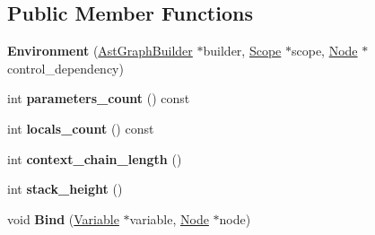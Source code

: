 \subsection*{Public Member Functions}
\begin{DoxyCompactItemize}
\item 
{\bfseries Environment} (\hyperlink{classv8_1_1internal_1_1compiler_1_1_ast_graph_builder}{Ast\+Graph\+Builder} $\ast$builder, \hyperlink{classv8_1_1internal_1_1_scope}{Scope} $\ast$scope, \hyperlink{classv8_1_1internal_1_1compiler_1_1_node}{Node} $\ast$control\+\_\+dependency)\hypertarget{classv8_1_1internal_1_1compiler_1_1_ast_graph_builder_1_1_environment_a28b10408f4df6a0f319e955a267ce7bc}{}\label{classv8_1_1internal_1_1compiler_1_1_ast_graph_builder_1_1_environment_a28b10408f4df6a0f319e955a267ce7bc}

\item 
int {\bfseries parameters\+\_\+count} () const \hypertarget{classv8_1_1internal_1_1compiler_1_1_ast_graph_builder_1_1_environment_af3737b4f3c9da4ed54ea6dd832f78bf1}{}\label{classv8_1_1internal_1_1compiler_1_1_ast_graph_builder_1_1_environment_af3737b4f3c9da4ed54ea6dd832f78bf1}

\item 
int {\bfseries locals\+\_\+count} () const \hypertarget{classv8_1_1internal_1_1compiler_1_1_ast_graph_builder_1_1_environment_a3e27db5d6dfd2b7329654f568ca5138f}{}\label{classv8_1_1internal_1_1compiler_1_1_ast_graph_builder_1_1_environment_a3e27db5d6dfd2b7329654f568ca5138f}

\item 
int {\bfseries context\+\_\+chain\+\_\+length} ()\hypertarget{classv8_1_1internal_1_1compiler_1_1_ast_graph_builder_1_1_environment_ad0158a22455fee767e934446596ca9ef}{}\label{classv8_1_1internal_1_1compiler_1_1_ast_graph_builder_1_1_environment_ad0158a22455fee767e934446596ca9ef}

\item 
int {\bfseries stack\+\_\+height} ()\hypertarget{classv8_1_1internal_1_1compiler_1_1_ast_graph_builder_1_1_environment_a2dbbe672e8f1b3ccbb8e34c65aabef5a}{}\label{classv8_1_1internal_1_1compiler_1_1_ast_graph_builder_1_1_environment_a2dbbe672e8f1b3ccbb8e34c65aabef5a}

\item 
void {\bfseries Bind} (\hyperlink{classv8_1_1internal_1_1_variable}{Variable} $\ast$variable, \hyperlink{classv8_1_1internal_1_1compiler_1_1_node}{Node} $\ast$node)\hypertarget{classv8_1_1internal_1_1compiler_1_1_ast_graph_builder_1_1_environment_a3f2a9795e440abf04739382e96da8fc0}{}\label{classv8_1_1internal_1_1compiler_1_1_ast_graph_builder_1_1_environment_a3f2a9795e440abf04739382e96da8fc0}


\end{DoxyCompactItemize}
